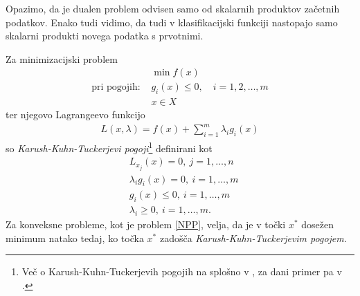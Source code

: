 \documentclass[mat1]{fmfdelo}
\begin{document}
Opazimo, da je dualen problem odvisen samo od skalarnih produktov začetnih podatkov. Enako tudi vidimo, da tudi v klasifikacijski funkciji nastopajo samo skalarni produkti novega podatka s prvotnimi. 

Za minimizacijski problem
\begin{align*}
	&\min f(x)\\ 
	\text{pri pogojih: } &g_i(x) \le 0, \quad i = 1,2,\ldots,m \\
	&x\in X
\end{align*}
ter njegovo Lagrangeevo funkcijo
\begin{align*}
	L(x, \lambda) = f(x) + \sum_{i=1}^{m}\lambda_ig_i(x)
\end{align*}
so \emph{Karush-Kuhn-Tuckerjevi pogoji}\footnote{Več o Karush-Kuhn-Tuckerjevih pogojih na splošno v \cite[str. 207--218]{ITNO}, za dani primer pa v \cite[str. 220 spodaj]{ESL}.} definirani kot
\begin{align*}
	&L_{x_j}(x) = 0,~ j = 1, \ldots, n \\
	&\lambda_ig_i(x) = 0,~ i = 1,\ldots,m \\
	&g_i(x) \le 0,~ i = 1,\ldots,m \\
	&\lambda_i \ge 0,~ i = 1,\ldots,m.
\end{align*}
Za konveksne probleme, kot je problem \eqref{NPP}, velja, da je v točki $x^*$ dosežen minimum natako tedaj, ko točka $x^*$ zadošča \emph{Karush-Kuhn-Tuckerjevim pogojem.}
\end{document}
